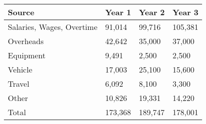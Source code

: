 \documentclass[version=last,
    paper=a4,                               %
    10pt,                                   %
    dvipsnames,
    oneside,                              %
    headings=openany,                       %
    open=any,
    BCOR=7mm,                               %
    DIV=15,     %
]{scrbook}
\begin{document}
\begin{longtabu} to \linewidth { |  X | X | X | X | }
\hline
{}
Source & Year 1 & Year 2 & Year 3\\
\hline
\endhead



Salaries, Wages, Overtime & 91,014 & 99,716 & 105,381\\



Overheads & 42,642 & 35,000 & 37,000\\



Equipment & 9,491 & 2,500 & 2,500\\



Vehicle & 17,003 & 25,100 & 15,600\\



Travel & 6,092 & 8,100 & 3,300\\



Other & 10,826 & 19,331 & 14,220\\



Total & 173,368 & 189,747 & 178,001\\


\hline
\end{longtabu}





\end{document}
